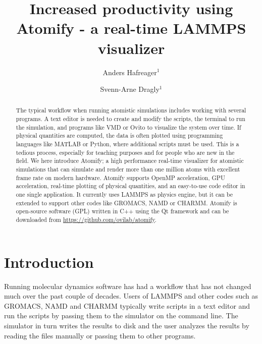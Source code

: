 \documentclass[12pt,a4paper,final]{iopart}
\begin{document}
\title{Increased productivity using Atomify - a real-time LAMMPS visualizer}

\author[cor1]{Anders Hafreager$^{1}$}

\author{Svenn-Arne Dragly$^{1}$}
\address{$^1$Department of Physics - University of Oslo\\Sem S{\ae}lands vei 24, NO-0316, Oslo, Norway}

\begin{abstract}
The typical workflow when running atomistic simulations includes working with several programs.
A text editor is needed to create and modify the scripts, the terminal to run the simulation, and programs like VMD or Ovito to visualize the system over time.
If physical quantities are computed, the data is often plotted using programming languages like MATLAB or Python,
where additional scripts must be used.
This is a tedious process, especially for teaching purposes and for people who are new in the field.
We here introduce Atomify; a high performance real-time visualizer for atomistic simulations that can simulate and render more than one million atoms with excellent frame rate on modern hardware.
Atomify supports OpenMP acceleration, GPU acceleration, real-time plotting of physical quantities, and an easy-to-use code editor in one single application.
It currently uses LAMMPS as physics engine, but it can be extended to support other codes like GROMACS, NAMD or CHARMM.
Atomify is open-source software (GPL) written in C++ using the Qt framework and can be downloaded from \url{https://github.com/ovilab/atomify}.
\end{abstract}

\vspace{2pc}

\section{Introduction}
Running molecular dynamics software has had a workflow that has not changed much over the past couple of decades.
Users of LAMMPS\cite{Plimpton1995Fast} and other codes such
as GROMACS\cite{berendsen1995gromacs}, NAMD\cite{nelson1996namd} and CHARMM\cite{brooks2009charmm} typically write
scripts in a text editor and run the scripts by passing them to the simulator on the command line.
The simulator in turn writes the results to disk and the user analyzes the results
by reading the files manually or passing them to other programs.
\end{document}
